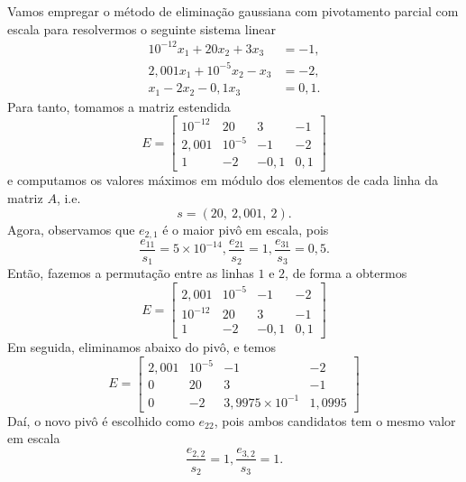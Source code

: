 \begin{ex}\label{ex:egauss_pivo}
  Vamos empregar o método de eliminação gaussiana com pivotamento parcial com escala para resolvermos o seguinte sistema linear
  \begin{align}
    10^{-12}x_1 + 20x_2 + 3x_3 &= -1,\\
    2,001x_1 + 10^{-5}x_2 - x_3 &= -2,\\
    x_1 - 2x_2 - 0,1x_3 &= 0,1.
  \end{align}
  Para tanto, tomamos a matriz estendida
  \begin{equation}
    E =
    \begin{bmatrix}
      10^{-12} & 20 & 3 & -1\\
      2,001 & 10^{-5} & -1 & -2\\
      1 & -2 & -0,1 & 0,1
    \end{bmatrix}
  \end{equation}
  e computamos os valores máximos em módulo dos elementos de cada linha da matriz $A$, i.e.
  \begin{equation}
    s = (20,~2,001,~2).
  \end{equation}
  Agora, observamos que $e_{2,1}$ é o maior pivô em escala, pois
  \begin{equation}
    \frac{e_{11}}{s_1} = 5\times 10^{-14}, \frac{e_{21}}{s_2} = 1, \frac{e_{31}}{s_3}=0,5.
  \end{equation}
  Então, fazemos a permutação entre as linhas $1$ e $2$, de forma a obtermos
  \begin{equation}
    E =
    \begin{bmatrix}
      2,001 & 10^{-5} & -1 & -2\\
      10^{-12} & 20 & 3 & -1\\
      1 & -2 & -0,1 & 0,1
    \end{bmatrix}    
  \end{equation}
  Em seguida, eliminamos abaixo do pivô, e temos
  \begin{equation}
    E =
    \begin{bmatrix}
      2,001 & 10^{-5} & -1 & -2\\
      0 & 20 & 3 & -1\\
      0 & -2 & 3,9975\times 10^{-1} & 1,0995
    \end{bmatrix}
  \end{equation}
  Daí, o novo pivô é escolhido como $e_{22}$, pois ambos candidatos tem o mesmo valor em escala
  \begin{equation}
    \frac{e_{2,2}}{s_2} = 1, \frac{e_{3,2}}{s_3} = 1.

\end{equation}
\end{ex}
